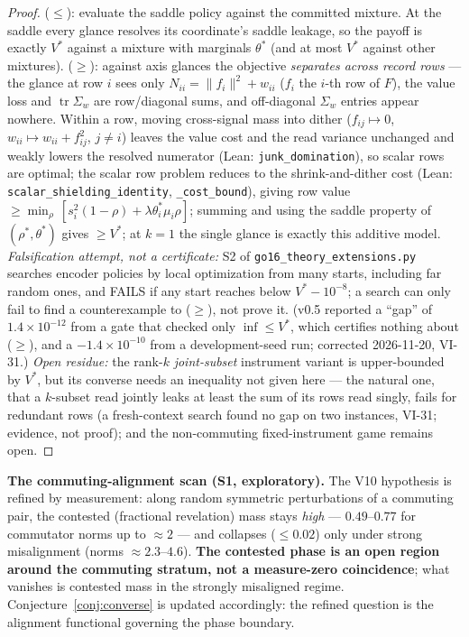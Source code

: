 \documentclass[11pt]{article}
\theoremstyle{definition}
\newcommand{\tr}{\operatorname{tr}}
\begin{document}
\begin{proof}
($\le$): evaluate the saddle policy against the committed mixture.
At the saddle every glance resolves its coordinate's saddle leakage,
so the payoff is exactly $V^\ast$ against a mixture with marginals
$\theta^\ast$ (and at most $V^\ast$ against other mixtures). ($\ge$): against axis
glances the objective \emph{separates across record rows} --- the
glance at row $i$ sees only $N_{ii} = \lVert f_i\rVert^2 + w_{ii}$
($f_i$ the $i$-th row of $F$), the value loss and $\tr\Sigma_w$ are
row/diagonal sums, and off-diagonal $\Sigma_w$ entries appear
nowhere. Within a row, moving cross-signal mass into dither
($f_{ij}\mapsto 0$, $w_{ii}\mapsto w_{ii} + f_{ij}^2$, $j\neq i$)
leaves the value cost and the read variance unchanged and weakly
lowers the resolved numerator (Lean: \texttt{junk\_domination}), so
scalar rows are optimal; the scalar row problem reduces to the
shrink-and-dither cost (Lean: \texttt{scalar\_shielding\_identity},
\texttt{\_cost\_bound}), giving row value $\ge \min_\rho\,
[s_i^2(1-\rho) + \lambda\theta^\ast_i\mu_i\rho]$; summing and using
the saddle property of $(\rho^\ast,\theta^\ast)$ gives $\ge
V^\ast$; at $k=1$ the single glance is exactly this additive model.
\emph{Falsification attempt, not a certificate:} S2 of
\texttt{go16\_theory\_extensions.py} searches encoder policies by local
optimization from many starts, including far random ones, and FAILS if
any start reaches below $V^\ast-10^{-8}$; a search can only fail to
find a counterexample to ($\ge$), not prove it. (v0.5 reported a
``gap'' of $1.4\times10^{-12}$ from a gate that checked only
$\inf\le V^\ast$, which certifies nothing about ($\ge$), and a
$-1.4\times10^{-10}$ from a development-seed run; corrected 2026-11-20,
VI-31.)
\emph{Open residue:} the rank-$k$ \emph{joint-subset} instrument
variant is upper-bounded by $V^\ast$, but its converse needs an
inequality not given here --- the natural one, that a $k$-subset read
jointly leaks at least the sum of its rows read singly, fails for
redundant rows (a fresh-context search found no gap on two instances,
VI-31; evidence, not proof); and the non-commuting fixed-instrument game
remains open.
\end{proof}

\textbf{The commuting-alignment scan (S1, exploratory).} The V10
hypothesis is refined by measurement: along random symmetric
perturbations of a commuting pair, the contested (fractional
revelation) mass stays \emph{high} --- $0.49$--$0.77$ for
commutator norms up to $\approx 2$ --- and collapses ($\le 0.02$)
only under strong misalignment (norms $\approx 2.3$--$4.6$).
\textbf{The contested phase is an open region around the commuting
stratum, not a measure-zero coincidence}; what vanishes is contested
mass in the strongly misaligned regime.
Conjecture~\ref{conj:converse} is updated accordingly: the refined
question is the alignment functional governing the phase boundary.
\end{document}
